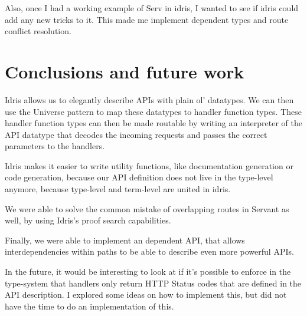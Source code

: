 \documentclass[12pt,a4paper]{article}
\begin{document}
Also, once I had a working example of Serv in idris, I wanted to see if idris
could add any new tricks to it. This made me implement dependent types and
route conflict resolution.

\section{Conclusions and future work}
Idris allows us to elegantly describe APIs with plain ol' datatypes. We
can then use the Universe pattern to map these datatypes to handler
function types. These handler function types can then be made routable
by writing an interpreter of the API datatype that decodes the incoming
requests and passes the correct parameters to the handlers.

Idris makes it easier to write utility functions, like documentation generation
or code generation, because our API definition does not live in the type-level
anymore, because type-level and term-level are united in idris.

We were able to solve the common mistake of overlapping routes in Servant as well,
by using Idris's proof search capabilities.

Finally, we were able to implement an dependent API, that allows interdependencies
within paths to be able to describe even more powerful APIs.

In the future, it would be interesting to look at if it's possible to enforce in 
the type-system that handlers only return HTTP Status codes that are defined
in the API description. I explored some ideas on how to implement this, but
did not have the time to do an implementation of this.


\end{document}
